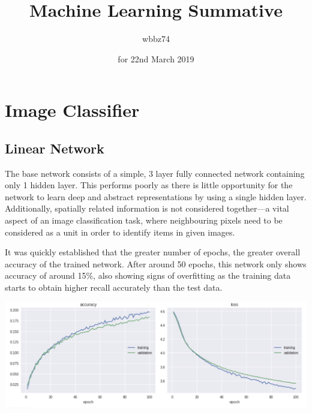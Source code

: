 \documentclass[11pt]{article}
\begin{document}
\title{\textbf{Machine Learning Summative}}
\date{for 22nd March 2019}
\author{wbbz74}
\maketitle 

\section{Image Classifier}


\subsection{Linear Network}

The base network consists of a simple, 3 layer fully connected network containing only 1 hidden layer. This performs poorly as there is little opportunity for the network to learn deep and abstract representations by using a single hidden layer. Additionally, spatially related information is not considered together---a vital aspect of an image classification task, where neighbouring pixels need to be considered as a unit in order to identify items in given images. 

It was quickly established that the greater number of epochs, the greater overall accuracy of the trained network. After around 50 epochs, this network only shows accuracy of around 15\%, also showing signs of overfitting as the training data starts to obtain higher recall accurately than the test data.

    \begin{center}
        \begin{minipage}{0.75\linewidth}
            \includegraphics[width=\linewidth]{accuracy0}
        \end{minipage}%
    \end{center}
    
\end{document}
